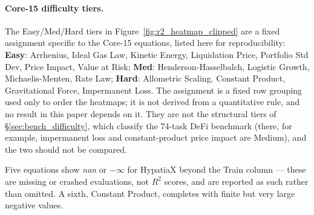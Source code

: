 \documentclass[twoside,11pt]{article}
\newcommand{\Rsq}{R^{2}}
\begin{document}
\paragraph{Core-15 difficulty tiers.}
The Easy/Med/Hard tiers in Figure~\ref{fig:r2_heatmap_clipped} are a fixed assignment
specific to the Core-15 equations, listed here for reproducibility:
\textbf{Easy}: Arrhenius, Ideal Gas Law, Kinetic Energy, Liquidation Price,
Portfolio Std Dev, Price Impact, Value at Risk;
\textbf{Med}: Henderson-Hasselbalch, Logistic Growth, Michaelis-Menten, Rate Law;
\textbf{Hard}: Allometric Scaling, Constant Product, Gravitational Force,
Impermanent Loss.
The assignment is a fixed row grouping used only to order the heatmaps; it is not derived from a quantitative rule, and no result in this paper depends on it.
They are not the structural tiers of §\ref{sec:bench_difficulty}, which classify the
74-task DeFi benchmark (there, for example, impermanent loss and constant-product
price impact are Medium), and the two should not be compared.

Five equations show \textit{nan} or $-\infty$ for HypatiaX beyond the Train
column --- these are missing or crashed evaluations, not $\Rsq$ scores, and are
reported as such rather than omitted. A sixth, Constant Product, completes with
finite but very large negative values.
\end{document}
